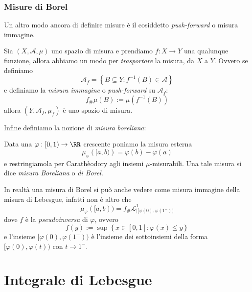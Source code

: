\documentclass[11pt]{scrartcl}
\begin{document}
	\subsubsection{Misure di Borel}
	
	Un altro modo ancora di definire misure è il cosiddetto \textit{push-forward} o misura immagine. 
	\begin{definition}
		Sia $(X,\mathcal{A},\mu)$ uno spazio di misura e prendiamo $f:X\to Y$ una qualunque funzione, allora abbiamo un modo per \textit{trasportare} la misura, da $X$ a $Y$. Ovvero se definiamo
		$$\mathcal{A}_f=\left\{B\subseteq Y : f^{-1}(B)\in \mathcal{A}\right\}$$
		e definiamo la \textit{misura immagine} o \textit{push-forward} su $\mathcal{A}_f$:
		$$f_\#\mu(B):=\mu\left(f^{-1}(B)\right)$$
		allora $(Y,\mathcal{A}_f,\mu_f)$ è uno spazio di misura.
	\end{definition}
	Infine definiamo la nozione di \textit{misura boreliana}:
	\begin{definition}
		Data una $\varphi:[0,1)\to \RR$ crescente poniamo la misura esterna
		$$\mu_\varphi\left([a,b)\right)=\varphi(b)-\varphi(a)$$
		e restringiamola per Carathèodory agli insiemi $\mu$-misurabili. Una tale misura si dice \textit{misura Boreliana} o \textit{di Borel}.
	\end{definition}
	In realtà una misura di Borel si può anche vedere come misura immagine della misura di Lebesgue, infatti non è altro che
	$$\mu_\varphi([a,b))=f_\#\mathscr{L}^1_{\mid [\varphi(0),\varphi(1^-))}$$
	dove $f$ è la \textit{pseudoinversa} di $\varphi$, ovvero
	$$f(y):=\sup\left\{x\in[0,1]:\varphi(x)\le y\right\}$$
	e l'insieme $[\varphi(0),\varphi(1^-))$ è l'insieme dei sottoinsiemi della forma $[\varphi(0),\varphi(t))$ con $t\to 1^-$. 
	
	\newpage
	
	\section{Integrale di Lebesgue}
	
\end{document}
